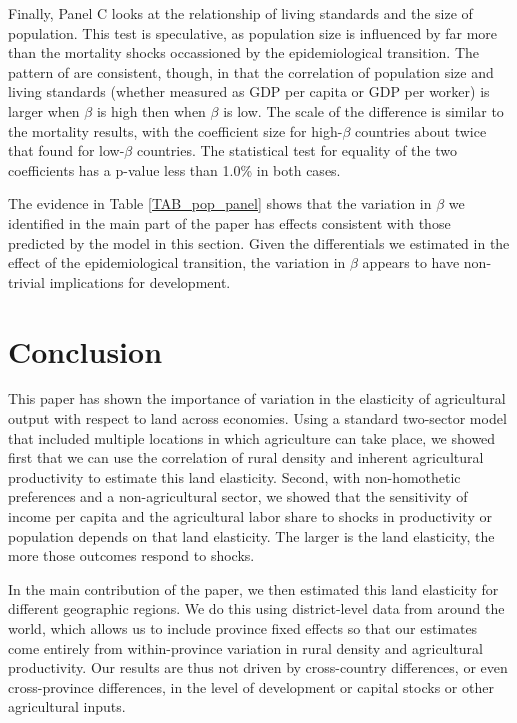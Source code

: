 \documentclass[11pt]{article}
\begin{document}
Finally, Panel C looks at the relationship of living standards and the size of population. This test is speculative, as population size is influenced by far more than the mortality shocks occassioned by the epidemiological transition. The pattern of are consistent, though, in that the correlation of population size and living standards (whether measured as GDP per capita or GDP per worker) is larger when $\beta$ is high then when $\beta$ is low. The scale of the difference is similar to the mortality results, with the coefficient size for high-$\beta$ countries about twice that found for low-$\beta$ countries. The statistical test for equality of the two coefficients has a p-value less than 1.0\% in both cases.

The evidence in Table \ref{TAB_pop_panel} shows that the variation in $\beta$ we identified in the main part of the paper has effects consistent with those predicted by the model in this section. Given the differentials we estimated in the effect of the epidemiological transition, the variation in $\beta$ appears to have non-trivial implications for development.

\section{Conclusion}
This paper has shown the importance of variation in the elasticity of agricultural output with respect to land across economies. Using a standard two-sector model that included multiple locations in which agriculture can take place, we showed first that we can use the correlation of rural density and inherent agricultural productivity to estimate this land elasticity. Second, with non-homothetic preferences and a non-agricultural sector, we showed that the sensitivity of income per capita and the agricultural labor share to shocks in productivity or population depends on that land elasticity. The larger is the land elasticity, the more those outcomes respond to shocks. 

In the main contribution of the paper, we then estimated this land elasticity for different geographic regions. We do this using district-level data from around the world, which allows us to include province fixed effects so that our estimates come entirely from within-province variation in rural density and agricultural productivity. Our results are thus not driven by cross-country differences, or even cross-province differences, in the level of development or capital stocks or other agricultural inputs. 
\end{document}
